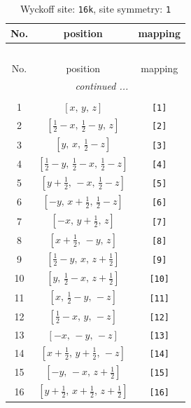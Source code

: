 \documentclass[fleqn,8pt]{jsarticle}
\begin{document}
\begin{longtable}{ccc}
\caption{Wyckoff site: {\tt 16k}, site symmetry: {\tt 1}}
 \\
 \hline \hline
No. & position & mapping \\ \hline \endfirsthead

\multicolumn{2}{l}{\tablename\ \thetable{}} \\
 \hline \hline
No. & position & mapping \\ \hline \endhead

 \hline \hline
\multicolumn{2}{r}{\footnotesize\it continued ...} \\ \endfoot

 \hline \hline
\multicolumn{2}{r}{} \\ \endlastfoot

1 & $\left[ x,\, y,\, z \right]$ & {\tt [1]} \\ \hline
2 & $\left[ \frac{1}{2} - x,\, \frac{1}{2} - y,\, z \right]$ & {\tt [2]} \\ \hline
3 & $\left[ y,\, x,\, \frac{1}{2} - z \right]$ & {\tt [3]} \\ \hline
4 & $\left[ \frac{1}{2} - y,\, \frac{1}{2} - x,\, \frac{1}{2} - z \right]$ & {\tt [4]} \\ \hline
5 & $\left[ y + \frac{1}{2},\, - x,\, \frac{1}{2} - z \right]$ & {\tt [5]} \\ \hline
6 & $\left[ - y,\, x + \frac{1}{2},\, \frac{1}{2} - z \right]$ & {\tt [6]} \\ \hline
7 & $\left[ - x,\, y + \frac{1}{2},\, z \right]$ & {\tt [7]} \\ \hline
8 & $\left[ x + \frac{1}{2},\, - y,\, z \right]$ & {\tt [8]} \\ \hline
9 & $\left[ \frac{1}{2} - y,\, x,\, z + \frac{1}{2} \right]$ & {\tt [9]} \\ \hline
10 & $\left[ y,\, \frac{1}{2} - x,\, z + \frac{1}{2} \right]$ & {\tt [10]} \\ \hline
11 & $\left[ x,\, \frac{1}{2} - y,\, - z \right]$ & {\tt [11]} \\ \hline
12 & $\left[ \frac{1}{2} - x,\, y,\, - z \right]$ & {\tt [12]} \\ \hline
13 & $\left[ - x,\, - y,\, - z \right]$ & {\tt [13]} \\ \hline
14 & $\left[ x + \frac{1}{2},\, y + \frac{1}{2},\, - z \right]$ & {\tt [14]} \\ \hline
15 & $\left[ - y,\, - x,\, z + \frac{1}{2} \right]$ & {\tt [15]} \\ \hline
16 & $\left[ y + \frac{1}{2},\, x + \frac{1}{2},\, z + \frac{1}{2} \right]$ & {\tt [16]} \\
\end{longtable}
\end{document}
